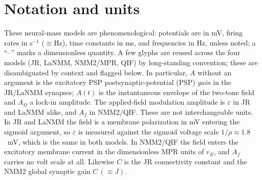 \documentclass[11pt,a4paper]{article}
\newif\ifappendices
\providecommand{\DIFaddtex}[1]{{\protect\color{blue} \sf #1}} %
\providecommand{\DIFdeltex}[1]{{\protect\color{red} \scriptsize #1}} %
\providecommand{\DIFaddbegin}{} %
\providecommand{\DIFaddend}{} %
\providecommand{\DIFdelbegin}{} %
\providecommand{\DIFdelend}{} %
\providecommand{\DIFadd}[1]{\texorpdfstring{\DIFaddtex{#1}}{#1}} %
\providecommand{\DIFdel}[1]{\texorpdfstring{\DIFdeltex{#1}}{}} %
\begin{document}



\fi
\ifappendices
\clearpage
\appendix
\renewcommand{\thefigure}{S\arabic{figure}}
\setcounter{figure}{0}
\makeatletter
\let\ne@stdsection\section
\renewcommand{\section}{\clearpage\ne@stdsection}
\makeatother

\section{Notation and units}\label{app:notation}
These neural-mass models are phenomenological: potentials are in mV, firing rates in
s$^{-1}$ ($\equiv$Hz), time constants in ms, and frequencies in Hz, unless noted; a
``--'' marks a dimensionless quantity. A few glyphs are reused across the four models
(JR, LaNMM, NMM2/MPR, QIF) by long-standing convention; these are disambiguated by
context and flagged below. In particular, $A$ without an argument is the excitatory \DIFdelbegin \DIFdel{PSP }\DIFdelend \DIFaddbegin \DIFadd{postsynaptic-potential (PSP) }\DIFaddend \emph{gain} in the
JR/LaNMM synapses; $A(t)$ is the instantaneous envelope of the two-tone field and
$A_\Omega$ a lock-in amplitude. The applied-field modulation amplitude is
$\varepsilon$ in JR and LaNMM alike, and $A_f$ in NMM2/QIF. These are not
interchangeable units. In JR and LaNMM the field is a membrane polarization in mV
entering the sigmoid argument, so $\varepsilon$ is measured against the sigmoid voltage
scale $1/\rho\approx1.8$~mV, which is the same in both models. In NMM2/QIF the field
enters the excitatory membrane current in the dimensionless MPR units of $v_E$, and
$A_f$ carries no volt scale at all. Likewise $C$ is the JR connectivity constant and the
NMM2 global synaptic gain $C\,(\equiv J)$.
\end{document}
